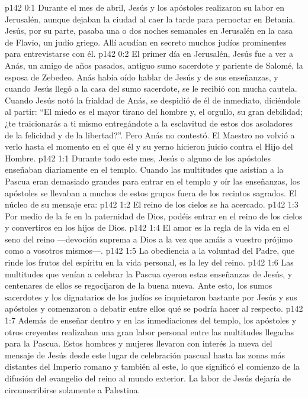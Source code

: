 \author{Comisión de seres intermedios}
\vs p142 0:1 Durante el mes de abril, Jesús y los apóstoles realizaron su labor en Jerusalén, aunque dejaban la ciudad al caer la tarde para pernoctar en Betania. Jesús, por su parte, pasaba una o dos noches semanales en Jerusalén en la casa de Flavio, un judío griego. Allí acudían en secreto muchos judíos prominentes para entrevistarse con él.
\vs p142 0:2 \pc El primer día en Jerusalén, Jesús fue a ver a Anás, un amigo de años pasados, antiguo sumo sacerdote y pariente de Salomé, la esposa de Zebedeo. Anás había oído hablar de Jesús y de sus enseñanzas, y cuando Jesús llegó a la casa del sumo sacerdote, se le recibió con mucha cautela. Cuando Jesús notó la frialdad de Anás, se despidió de él de inmediato, diciéndole al partir: “El miedo es el mayor tirano del hombre y, el orgullo, su gran debilidad; ¿te traicionarás a ti mismo entregándote a la esclavitud de estos dos asoladores de la felicidad y de la libertad?”. Pero Anás no contestó. El Maestro no volvió a verlo hasta el momento en el que él y su yerno hicieron juicio contra el Hijo del Hombre.
\vs p142 1:1 Durante todo este mes, Jesús o alguno de los apóstoles enseñaban diariamente en el templo. Cuando las multitudes que asistían a la Pascua eran demasiado grandes para entrar en el templo y oír las enseñanzas, los apóstoles se llevaban a muchos de estos grupos fuera de los recintos sagrados. El núcleo de su mensaje era:
\vs p142 1:2 El reino de los cielos se ha acercado.
\vs p142 1:3 Por medio de la fe en la paternidad de Dios, podéis entrar en el reino de los cielos y convertiros en los hijos de Dios.
\vs p142 1:4 El amor es la regla de la vida en el seno del reino ---devoción suprema a Dios a la vez que amáis a vuestro prójimo como a vosotros mismos---.
\vs p142 1:5 La obediencia a la voluntad del Padre, que rinde los frutos del espíritu en la vida personal, es la ley del reino.
\vs p142 1:6 \pc Las multitudes que venían a celebrar la Pascua oyeron estas enseñanzas de Jesús, y centenares de ellos se regocijaron de la buena nueva. Ante esto, los sumos sacerdotes y los dignatarios de los judíos se inquietaron bastante por Jesús y sus apóstoles y comenzaron a debatir entre ellos qué se podría hacer al respecto.
\vs p142 1:7 Además de enseñar dentro y en las inmediaciones del templo, los apóstoles y otros creyentes realizaban una gran labor personal entre las multitudes llegadas para la Pascua. Estos hombres y mujeres llevaron con interés la nueva del mensaje de Jesús desde este lugar de celebración pascual hasta las zonas más distantes del Imperio romano y también al este, lo que significó el comienzo de la difusión del evangelio del reino al mundo exterior. La labor de Jesús dejaría de circunscribirse solamente a Palestina.
